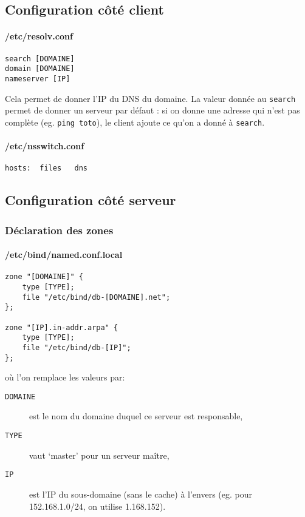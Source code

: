 \documentclass[10pt,a4paper,french]{article}
\begin{document}
\subsection{Configuration côté client}

\paragraph{/etc/resolv.conf}
\begin{verbatim}
search [DOMAINE]
domain [DOMAINE]
nameserver [IP]
\end{verbatim}
Cela permet de donner l'IP du DNS du domaine. La valeur donnée au {\tt search} permet de donner un serveur par défaut : si on donne une adresse qui n'est pas complète (eg. {\tt ping toto}), le client ajoute ce qu'on a donné à {\tt search}.

\paragraph{/etc/nsswitch.conf}
\begin{verbatim}
hosts:	files	dns
\end{verbatim}

\subsection{Configuration côté serveur}

\subsubsection{Déclaration des zones}

\paragraph{/etc/bind/named.conf.local}
\begin{verbatim}
zone "[DOMAINE]" {
    type [TYPE];
    file "/etc/bind/db-[DOMAINE].net";
};

zone "[IP].in-addr.arpa" {
    type [TYPE];
    file "/etc/bind/db-[IP]";
};
\end{verbatim}
où l'on remplace les valeurs par:
\begin{description}
\item[\tt DOMAINE] est le nom du domaine duquel ce serveur est responsable,
\item[\tt TYPE] vaut `master' pour un serveur maître,
\item[\tt IP] est l'IP du sous-domaine (sans le cache) à l'envers (eg. pour 152.168.1.0/24, on utilise 1.168.152).
\end{description}
\end{document}
